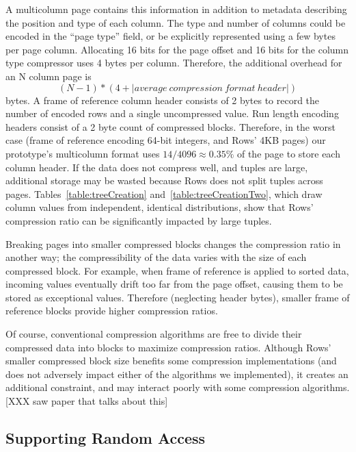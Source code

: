 \documentclass{sig-alternate-sigmod08}
\newcommand{\rows}{Rows\xspace}
\newcommand{\rowss}{Rows'\xspace}
\begin{document}
A multicolumn page contains this information in addition to metadata
describing the position and type of each column.  The type and number
of columns could be encoded in the ``page type'' field, or be
explicitly represented using a few bytes per page column.  Allocating
16 bits for the page offset and 16 bits for the column type compressor
uses 4 bytes per column.  Therefore, the additional overhead for an N
column page is
\[
   (N-1) * (4 + |average~compression~format~header|)
\]
bytes.  A frame of reference column header consists of 2 bytes to
record the number of encoded rows and a single uncompressed
value. Run length encoding headers consist of a 2 byte count of
compressed blocks.  Therefore, in the worst case (frame of reference
encoding 64-bit integers, and \rowss 4KB pages) our prototype's
multicolumn format uses $14/4096\approx0.35\%$ of the page to store
each column header.  If the data does not compress well, and tuples
are large, additional storage may be wasted because \rows does not
split tuples across pages.  Tables~\ref{table:treeCreation}
and~\ref{table:treeCreationTwo}, which draw column values from
independent, identical distributions, show that \rowss compression
ratio can be significantly impacted by large tuples.


Breaking pages into smaller compressed blocks changes the compression
ratio in another way; the compressibility of the data varies with the
size of each compressed block.  For example, when frame of reference
is applied to sorted data, incoming values eventually drift too far
from the page offset, causing them to be stored as exceptional values.
Therefore (neglecting header bytes), smaller frame of reference blocks
provide higher compression ratios.

Of course, conventional compression algorithms are free to divide
their compressed data into blocks to maximize compression ratios.
Although \rowss smaller compressed block size benefits some
compression implementations (and does not adversely impact either of
the algorithms we implemented), it creates an additional constraint,
and may interact poorly with some compression algorithms. [XXX saw paper that talks about this]

\subsection{Supporting Random Access}
\end{document}

